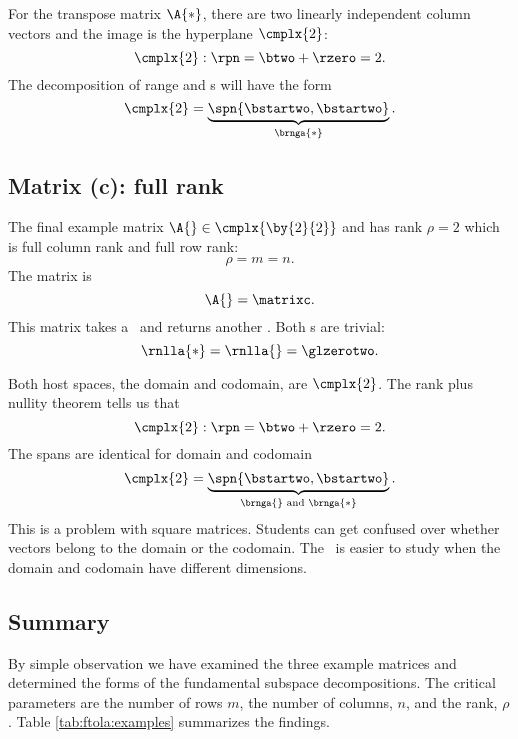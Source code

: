 For the transpose matrix $\A{*}$, there are two linearly independent column vectors and the image is the hyperplane $\cmplx{2}$:
\begin{equation}
  \cmplx{2}: \rpn = \btwo + \rzero = 2  .
\end{equation}
The decomposition of range and \ns s will have the form
\begin{equation}
  \cmplx{2} =  
    \underbrace{\spn{\bstartwo, \bstartwo}}_{\brnga{*}} .
\end{equation}

\subsection{Matrix (c): full rank}
The final example matrix $\A{}\in\cmplx{\by{2}{2}}$ and has rank $\rho = 2$ which is full column rank and full row rank:
\begin{equation}
  \rho = m = n.
\end{equation}
The matrix is 
\begin{equation}
  \A{} = \matrixc.
  \label{eq:matrix c}
\end{equation}
This matrix takes a \vv \ and returns another \vv. Both \ns s are trivial:
\begin{equation}
  \rnlla{*} = \rnlla{} = \glzerotwo.
\end{equation}

Both host spaces, the domain and codomain, are $\cmplx{2}$. The rank plus nullity theorem tells us that
\begin{equation}
  \cmplx{2}: \rpn  = \btwo + \rzero = 2  .
\end{equation}
The spans are identical for domain and codomain
\begin{equation}
  \cmplx{2} =  
    \underbrace{\spn{\bstartwo, \bstartwo}}_{\brnga{} \text{ and } \brnga{*}} .
\end{equation}
This is a problem with square matrices. Students can get confused over whether vectors belong to the domain or the codomain. The \ft \ is easier to study when the domain and codomain have different dimensions.

\subsection{Summary}
By simple observation we have examined the three example matrices and determined the forms of the fundamental subspace decompositions. The critical parameters are the number of rows $m$, the number of columns, $n$, and the rank, $\rho$. Table \eqref{tab:ftola:examples} summarizes the findings.


\endinput